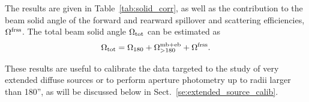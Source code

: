 %
The results are given in
Table~\ref{tab:solid_corr}, as well as the contribution to the beam
solid angle of the forward and rearward spillover and scattering
efficiencies, $\Omega^{\rm{frss}}$. The total beam solid angle 
$\Omega_{\rm{tot}}$ can be estimated as
\begin{equation}
\Omega_{\rm{tot}} = \Omega_{180} + \Omega_{>180}^{\rm{mb+eb}}
+ \Omega^{\rm{frss}}.
\label{eq:omega_beam_4pi}
\end{equation}

{\lp These results are useful to calibrate the data
targeted to the study of very extended diffuse sources or to perform
aperture photometry up to radii larger than 180'', as will be
discussed below in Sect.~\ref{se:extended_source_calib}.}

